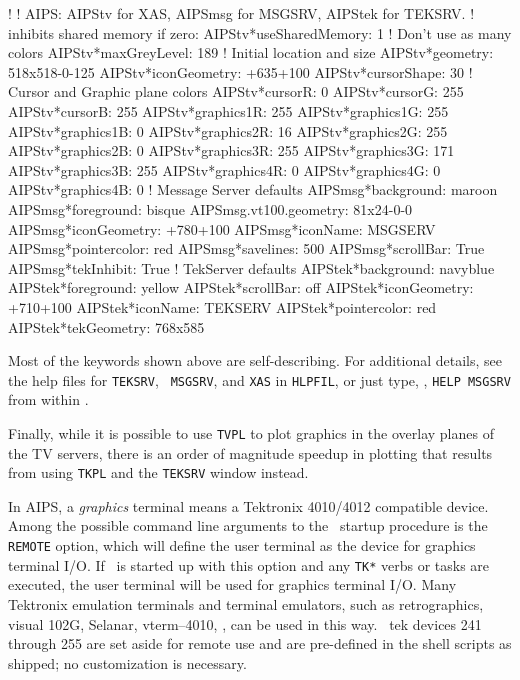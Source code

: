 \fortran
!
! AIPS: AIPStv for XAS, AIPSmsg for MSGSRV, AIPStek for TEKSRV.
!                                     inhibits shared memory if zero:
AIPStv*useSharedMemory: 1
!                                     Don't use as many colors
AIPStv*maxGreyLevel:    189
!                                     Initial location and size
AIPStv*geometry:        518x518-0-125
AIPStv*iconGeometry:   +635+100
AIPStv*cursorShape:     30
!                                     Cursor and Graphic plane colors
AIPStv*cursorR:          0
AIPStv*cursorG:        255
AIPStv*cursorB:        255
AIPStv*graphics1R:     255
AIPStv*graphics1G:     255
AIPStv*graphics1B:       0
AIPStv*graphics2R:      16
AIPStv*graphics2G:     255
AIPStv*graphics2B:       0
AIPStv*graphics3R:     255
AIPStv*graphics3G:     171
AIPStv*graphics3B:     255
AIPStv*graphics4R:       0
AIPStv*graphics4G:       0
AIPStv*graphics4B:       0
!                                     Message Server defaults
AIPSmsg*background: maroon
AIPSmsg*foreground: bisque
AIPSmsg.vt100.geometry: 81x24-0-0
AIPSmsg*iconGeometry: +780+100
AIPSmsg*iconName: MSGSERV
AIPSmsg*pointercolor: red
AIPSmsg*savelines: 500
AIPSmsg*scrollBar: True
AIPSmsg*tekInhibit: True
!                                     TekServer defaults
AIPStek*background: navyblue
AIPStek*foreground: yellow
AIPStek*scrollBar: off
AIPStek*iconGeometry:    +710+100
AIPStek*iconName:        TEKSERV
AIPStek*pointercolor:    red
AIPStek*tekGeometry:      768x585
\endfortran
\medskip

\noindent Most of the keywords shown above are self-describing.  For
additional details, see the help files for {\tt TEKSRV}, {\tt
MSGSRV}, and {\tt XAS} in {\tt\dol HLPFIL}, or just type, \eg, {\tt HELP
MSGSRV} from within \ttaips.

Finally, while it is possible to use {\tt TVPL} to plot graphics in the
overlay planes of the TV servers, there is an order of magnitude speedup
in plotting that results from using {\tt TKPL} and the {\tt TEKSRV}
window instead. \medskip


In AIPS, a {\it graphics\/} terminal means a Tektronix 4010/4012
compatible device.  Among the possible command line arguments to the
\AIPS\ startup procedure is the {\tt REMOTE} option, which will define
the user terminal as the device for graphics terminal I/O.  If \AIPS\ is
started up with this option and any {\tt TK*} verbs or tasks are
executed, the user terminal will be used for graphics terminal I/O.
Many Tektronix emulation terminals and terminal emulators, such as
retrographics, visual 102G, Selanar, vterm--4010, \etc, can be used in
this way.  \AIPS\ tek devices 241 through 255 are set aside for remote
use and are pre-defined in the shell scripts as shipped; no
customization is necessary.

